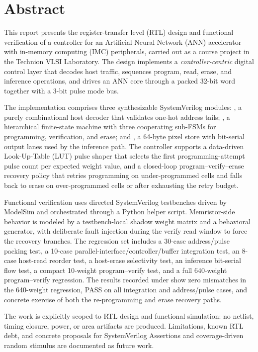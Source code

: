 
\chapter*{Abstract}

This report presents the register-transfer level (RTL) design and functional
verification of a controller for an Artificial Neural Network (ANN)
accelerator with in-memory computing (IMC) peripherals, carried out as a
course project in the Technion VLSI Laboratory. The design implements a
\emph{controller-centric} digital control layer that decodes host traffic,
sequences program, read, erase, and inference operations, and drives an ANN
core through a packed 32-bit word together with a 3-bit pulse mode bus.

The implementation comprises three synthesizable SystemVerilog modules:
, a purely combinational host decoder that
validates one-hot address tails; , a hierarchical
finite-state machine with three cooperating sub-FSMs for programming,
verification, and erase; and , a 64-byte pixel store
with bit-serial output lanes used by the inference path. The controller
supports a data-driven Look-Up-Table (LUT) pulse shaper that selects the
first programming-attempt pulse count per expected weight value, and a
closed-loop program--verify--erase recovery policy that retries programming
on under-programmed cells and falls back to erase on over-programmed cells or
after exhausting the retry budget.

Functional verification uses directed SystemVerilog testbenches driven by
ModelSim and orchestrated through a Python helper script. Memristor-side
behavior is modeled by a testbench-local shadow weight matrix and a
behavioral  generator, with deliberate fault injection
during the verify read window to force the recovery branches. The regression
set includes a 30-case address/pulse packing test, a 10-case
parallel-interface/controller/buffer integration test, an 8-case host-read
reorder test, a host-erase selectivity test, an inference bit-serial flow
test, a compact 10-weight program--verify test, and a full 640-weight
program--verify regression. The results recorded under
 show zero mismatches in the 640-weight regression, PASS on all
integration and address/pulse cases, and concrete exercise of both the
re-programming and erase recovery paths.

The work is explicitly scoped to RTL design and functional simulation: no
netlist, timing closure, power, or area artifacts are produced. Limitations,
known RTL debt, and concrete proposals for SystemVerilog Assertions and
coverage-driven random stimulus are documented as future work.
